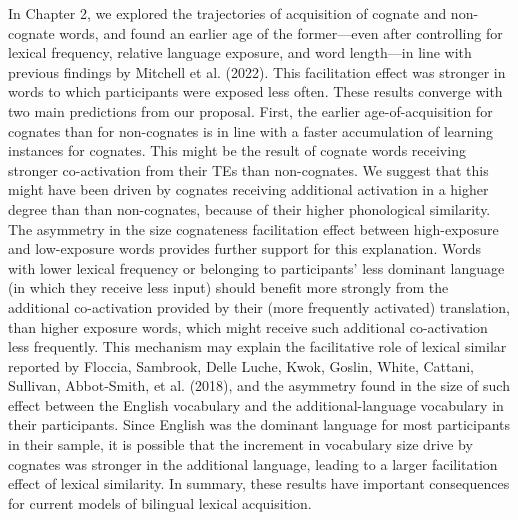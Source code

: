 \documentclass[
  12pt,
  b5paperpaper,
  twoside]{scrreprt}
\begin{document}
In Chapter 2, we explored the trajectories of acquisition of cognate and
non-cognate words, and found an earlier age of the former---even after
controlling for lexical frequency, relative language exposure, and word
length---in line with previous findings by Mitchell et al. (2022). This
facilitation effect was stronger in words to which participants were
exposed less often. These results converge with two main predictions
from our proposal. First, the earlier age-of-acquisition for cognates
than for non-cognates is in line with a faster accumulation of learning
instances for cognates. This might be the result of cognate words
receiving stronger co-activation from their TEs than non-cognates. We
suggest that this might have been driven by cognates receiving
additional activation in a higher degree than than non-cognates, because
of their higher phonological similarity. The asymmetry in the size
cognateness facilitation effect between high-exposure and low-exposure
words provides further support for this explanation. Words with lower
lexical frequency or belonging to participants' less dominant language
(in which they receive less input) should benefit more strongly from the
additional co-activation provided by their (more frequently activated)
translation, than higher exposure words, which might receive such
additional co-activation less frequently. This mechanism may explain the
facilitative role of lexical similar reported by Floccia, Sambrook,
Delle Luche, Kwok, Goslin, White, Cattani, Sullivan, Abbot‐Smith, et al.
(2018), and the asymmetry found in the size of such effect between the
English vocabulary and the additional-language vocabulary in their
participants. Since English was the dominant language for most
participants in their sample, it is possible that the increment in
vocabulary size drive by cognates was stronger in the additional
language, leading to a larger facilitation effect of lexical similarity.
In summary, these results have important consequences for current models
of bilingual lexical acquisition.
\end{document}
